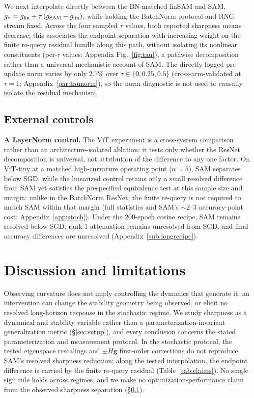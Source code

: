 \documentclass{article}
\theoremstyle{plain}
\theoremstyle{definition}
\theoremstyle{remark}
\begin{document}
We next interpolate directly between the BN-matched linSAM and SAM,
$g_\tau=g_{\rm lin}+\tau\,(g_{\rm SAM}-g_{\rm lin})$, while holding
the BatchNorm protocol and RNG stream fixed. Across the four sampled
$\tau$ values, both reported sharpness means decrease; this associates
the endpoint separation with increasing weight on the finite re-query
residual bundle along this path, without isolating its nonlinear
constituents (per-$\tau$ values: Appendix
Fig.~\ref{fig:tau}), a pathwise decomposition rather than a
universal mechanistic account of SAM. The directly logged
pre-update norm varies by only $2.7\%$ over $\tau\in\{0,0.25,0.5\}$
(cross-arm-validated at $\tau{=}1$;
Appendix~\ref{par:taunorm}), so the norm diagnostic is not used to
causally isolate the residual mechanism.

\subsection{External controls}
\label{sub:external}
\textbf{A LayerNorm control.} The ViT experiment is a cross-system
comparison rather than an architecture-isolated ablation: it tests
only whether the ResNet decomposition is universal, not attribution
of the difference to any one factor. On ViT-tiny at a matched
high-curvature operating point ($n{=}5$), SAM separates below SGD,
while the linearized control retains only a small resolved difference
from SAM yet satisfies the prespecified equivalence
test at this sample size and margin: unlike in the BatchNorm ResNet,
the finite re-query is not required to match SAM within that
margin (full statistics and SAM's
${\sim}2$--$3$ accuracy-point cost: Appendix~\ref{app:stoch}). Under
the 200-epoch cosine recipe, SAM remains resolved below SGD,
rank-1 attenuation remains unresolved from SGD, and
final accuracy differences are unresolved
(Appendix~\ref{sub:longrecipe}).

\section{Discussion and limitations}
\label{sec:discuss}
Observing curvature does not imply controlling the dynamics that
generate it: an intervention can change the stability geometry being
observed, or elicit no resolved long-horizon response in the
stochastic regime. We study sharpness as a dynamical and stability
variable rather than a parameterization-invariant generalization
metric (\S\ref{sec:setup}), and every
conclusion concerns the stated parameterization and
measurement protocol. In the stochastic protocol, the
tested eigenspace rescalings and $\pm H\mathbf{g}$ first-order
corrections do not reproduce SAM's resolved sharpness reduction;
along the tested interpolation, the endpoint difference is carried
by the finite re-query residual (Table~\ref{tab:claims}). No single
sign rule holds across regimes, and we make no
optimization-performance claim from the
observed sharpness separation (\S\ref{sub:external}).
\end{document}
